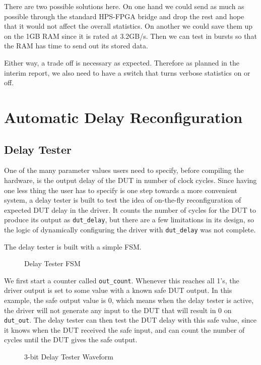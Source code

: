 There are two possible solutions here.
On one hand we could send as much as possible through the standard HPS-FPGA bridge and drop the rest and hope that it would not affect the overall statistics.
On another we could save them up on the 1GB RAM since it is rated at 3.2GB/s.
Then we can test in bursts so that the RAM has time to send out its stored data.

Either way, a trade off is necessary as expected.
Therefore as planned in the interim report, we also need to have a switch that turns verbose statistics on or off.

\section{Automatic Delay Reconfiguration}
\subsection{Delay Tester}
One of the many parameter values users need to specify, before compiling the hardware, is the output delay of the DUT in number of clock cycles.
Since having one less thing the user has to specify is one step towards a more convenient system, a delay tester is built to test the idea of on-the-fly reconfiguration of expected DUT delay in the driver.
It counts the number of cycles for the DUT to produce its output as \texttt{dut\_delay}, but there are a few limitations in its design, so the logic of dynamically configuring the driver with \texttt{dut\_delay} was not complete.

The delay tester is built with a simple FSM.

\begin{figure}[H]
  \centering
  
  \caption{Delay Tester FSM}
  \label{DelayTesterFSM}
\end{figure}

We first start a counter called \texttt{out\_count}.
Whenever this reaches all 1's, the driver output is set to some value with a known safe DUT output.
In this example, the safe output value is 0, which means when the delay tester is active, the driver will not generate any input to the DUT that will result in 0 on \texttt{dut\_out}.
The delay tester can then test the DUT delay with this safe value, since it knows when the DUT received the safe input, and can count the number of cycles until the DUT gives the safe output.

\begin{figure}[H]
  \centering
  
  \caption{3-bit Delay Tester Waveform}
  \label{DelayTesterWF}
\end{figure}

